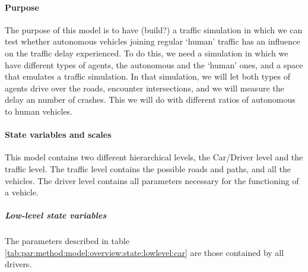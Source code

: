 \paragraph{Purpose}
\label{par:method:model:overview:purpose}

The purpose of this model is to have (build?) a traffic simulation in which we can test whether autonomous vehicles joining regular `human' traffic has an influence on the traffic delay experienced. To do this, we need a simulation in which we have different types of agents, the autonomous and the `human' ones, and a space that emulates a traffic simulation. In that simulation, we will let both types of agents drive over the roads, encounter intersections, and we will measure the delay an number of crashes. This we will do with different ratios of autonomous to human vehicles. 

\paragraph{State variables and scales}
\label{par:method:model:overview:state}

This model contains two different hierarchical levels, the Car/Driver level and the traffic level. The traffic level contains the possible roads and paths, and all the vehicles. The driver level contains all parameters necessary for the functioning of a vehicle.  

	\subparagraph{Low-level state variables}
	The parameters described in table \ref{tab:par:method:model:overview:state:lowlevel:car} are those contained by all drivers. 



